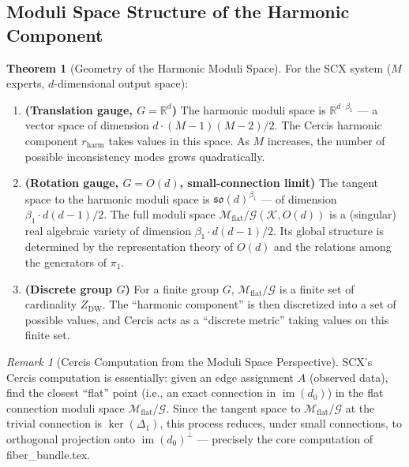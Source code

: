 \documentclass[12pt,a4paper]{article}
\theoremstyle{definition}
\newtheorem{theorem}{Theorem}[section]
\theoremstyle{remark}
\newtheorem{remark}{Remark}[section]
\theoremstyle{definition}
\newcommand{\R}{\mathbb{R}}
\newcommand{\Od}{O(d)}
\newcommand{\Lone}{\Delta_1}
\newcommand{\DW}{\mathrm{DW}}
\newcommand{\ZBetti}{\beta_1}
\newcommand{\Gflatquot}{\mathcal{M}_{\mathrm{flat}}/\mathcal{G}}
\DeclareMathOperator{\im}{im}
\begin{document}
\subsection{Moduli Space Structure of the Harmonic Component}

\begin{theorem}[Geometry of the Harmonic Moduli Space]\label{thm:harmonic_moduli_geometry}
For the SCX system ($M$ experts, $d$-dimensional output space):

\begin{enumerate}[label=(\alph*)]
    \item \textbf{(Translation gauge, $G = \R^d$)}
    The harmonic moduli space is $\R^{d \cdot \ZBetti}$ — a vector space of dimension $d \cdot (M-1)(M-2)/2$.
    The Cercis harmonic component $r_{\text{harm}}$ takes values in this space.
    As $M$ increases, the number of possible inconsistency modes grows quadratically.

    \item \textbf{(Rotation gauge, $G = \Od$, small-connection limit)}
    The tangent space to the harmonic moduli space is $\mathfrak{so}(d)^{\ZBetti}$ — of dimension $\ZBetti \cdot d(d-1)/2$.
    The full moduli space $\Gflatquot(\mathcal{K}, \Od)$ is a (singular) real algebraic variety of dimension $\ZBetti \cdot d(d-1)/2$.
    Its global structure is determined by the representation theory of $\Od$ and the relations among the generators of $\pi_1$.

    \item \textbf{(Discrete group $G$)}
    For a finite group $G$, $\Gflatquot$ is a finite set of cardinality $Z_{\DW}$.
    The ``harmonic component'' is then discretized into a set of possible values,
    and Cercis acts as a ``discrete metric'' taking values on this finite set.
\end{enumerate}
\end{theorem}

\begin{remark}[Cercis Computation from the Moduli Space Perspective]
SCX's Cercis computation is essentially: given an edge assignment $A$ (observed data),
find the closest ``flat'' point (i.e., an exact connection in $\im(d_0)$) in the flat connection moduli space $\Gflatquot$.
Since the tangent space to $\Gflatquot$ at the trivial connection is $\ker(\Lone)$,
this process reduces, under small connections, to orthogonal projection onto $\im(d_0)^\perp$ — precisely the core computation of fiber\_bundle.tex.
\end{remark}
\end{document}
